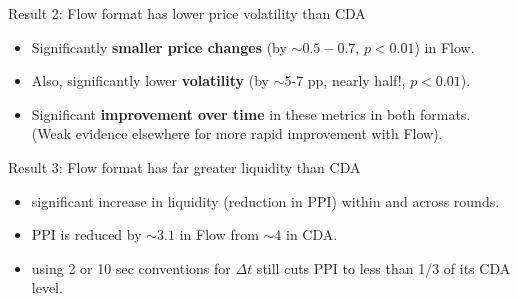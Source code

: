 \documentclass[10pt]{beamer}
\begin{document}
\begin{frame}{Result 2: Flow format has lower price volatility than CDA}
\begin{itemize}
\item Significantly \textbf{smaller price changes} (by $\sim 0.5 - 0.7$, $p<0.01$) in Flow. 
\item Also, significantly lower \textbf{volatility} (by $\sim$5-7 pp, nearly half!, $p<0.01$).
\item Significant \textbf{improvement over time} in these metrics in both formats.
(Weak evidence elsewhere for more rapid improvement with Flow). 
\end{itemize}   
\end{frame}

\begin{frame}{Result 3: Flow format has far greater liquidity than CDA}
\begin{itemize}
\item significant increase in liquidity (reduction in PPI) within and across rounds.
\item PPI is reduced by $\sim 3.1 $ in Flow from $\sim$4 in CDA.
\item using 2 or 10 sec conventions for $\Delta t$ still cuts PPI to less than 1/3 of its CDA level.
\end{itemize}   
\end{frame}



\end{document}
